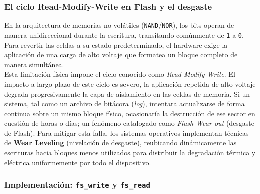\documentclass[12pt,letterpaper]{article}
\begin{document}
\subsubsection*{El ciclo Read-Modify-Write en Flash y el desgaste}
En la arquitectura de memorias no volátiles (\texttt{NAND}/\texttt{NOR}), los bits operan de manera
unidireccional durante la escritura, transitando comúnmente de \texttt{1} a \texttt{0}. Para revertir las celdas
a su estado predeterminado, el hardware exige la aplicación de una carga de alto voltaje que formatea un bloque
completo de manera simultánea.\\

Esta limitación física impone el ciclo conocido como \textit{Read-Modify-Write}. El impacto a largo plazo de este
ciclo es severo, la aplicación repetida de alto voltaje degrada progresivamente la capa de aislamiento en las
celdas de memoria. Si un sistema, tal como un archivo de bitácora (\textit{log}), intentara actualizarse de
forma continua sobre un mismo bloque físico, ocasionaría la destrucción de ese sector en cuestión de horas o
días; un fenómeno catalogado como \textit{Flash Wear-out} (desgaste de Flash). Para mitigar esta falla, los
sistemas operativos implementan técnicas de \textbf{Wear Leveling} (nivelación de desgaste), reubicando
dinámicamente las escrituras hacia bloques menos utilizados para distribuir la degradación térmica y eléctrica
uniformemente por todo el dispositivo.

\subsubsection*{Implementación: \texttt{fs\_write} y \texttt{fs\_read}}
\end{document}
